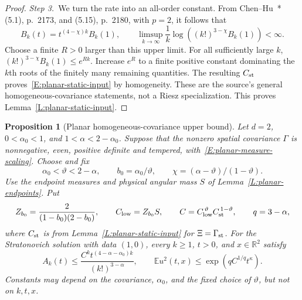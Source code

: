 \documentclass[12pt,oneside,openany]{book}
\numberwithin{equation}{section}
\newtheorem{proposition}[theorem]{Proposition}
\theoremstyle{nogostyle}
\theoremstyle{definition}
\newcommand{\R}{\mathbb{R}}
\newcommand{\E}{\mathbb{E}}
\begin{document}
\begin{proof}
  \medskip
  \noindent\textit{Step 3.~}We turn the rate into an all-order constant.
  From Chen--Hu~\cite{chen.hu:25:hyperbolic}*{(5.1), p.~2173, and (5.15),
  p.~2180}, with $p = 2$, it follows that
  \[
    B_k(t)=t^{(4-\chi)k}B_k(1),\qquad
    \limsup_{k\to\infty}\frac1k
    \log\left((k!)^{3-\chi}B_k(1)\right)<\infty.
  \]
  Choose a finite $R > 0$ larger than this upper limit. For all sufficiently
  large $k$, $(k!)^{3-\chi}B_k(1) \le e^{Rk}$. Increase $e^R$ to a finite
  positive constant dominating the $k$th roots of the finitely many remaining
  quantities. The resulting $C_{\rm st}$ proves~\eqref{E:planar-static-input} by
  homogeneity. These are the source's general homogeneous-covariance statements,
  not a Riesz specialization. This proves Lemma~\ref{L:planar-static-input}.
\end{proof}

\begin{proposition}[Planar homogeneous-covariance upper bound]
  \label{P:planar-upper}
  Let $d = 2$, $0 < \alpha_0 < 1$, and $1 < \alpha < 2-\alpha_0$. Suppose that
  the nonzero spatial covariance $\Gamma$ is nonnegative, even, positive
  definite and tempered, with~\eqref{E:planar-measure-scaling}. Choose and fix
  \[
    \alpha_0<\vartheta<2-\alpha,\qquad
    b_0=\alpha_0/\vartheta,\qquad
    \chi=(\alpha-\vartheta)/(1-\vartheta).
  \]
  Use the endpoint measures and physical angular mass $S$ of
  Lemma~\ref{L:planar-endpoints}. Put
  \[
    Z_{b_0}=\frac2{(1-b_0)(2-b_0)},\qquad
    C_{\rm low}=Z_{b_0}S,\qquad
    C=C_{\rm low}^{\,\vartheta}C_{\rm st}^{\,1-\vartheta},
    \qquad q=3-\alpha,
  \]
  where $C_{\rm st}$ is from Lemma~\ref{L:planar-static-input} for $\Xi =
  \Gamma_{\rm st}$. For the Stratonovich solution with data $(1,0)$, every $k
  \ge 1$, $t > 0$, and $x \in \R^2$ satisfy
  \begin{equation}\label{E:planar-upper}
    A_k(t)\le\frac{C^kt^{(4-\alpha-\alpha_0)k}}{(k!)^{3-\alpha}},
    \qquad
    \E u^2(t,x)\le\exp\left(qC^{1/q}t^\kappa\right).
  \end{equation}
  Constants may depend on the covariance, $\alpha_0$, and the fixed choice of
  $\vartheta$, but not on $k,t,x$.
\end{proposition}
\end{document}
